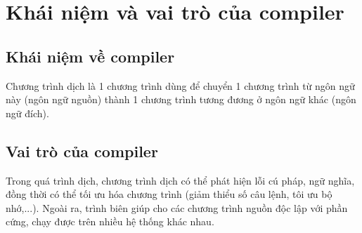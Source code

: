 \section{Khái niệm và vai trò của compiler}
\subsection{Khái niệm về compiler}
Chương trình dịch là 1 chương trình dùng để
chuyển 1 chương trình từ ngôn ngữ này (ngôn ngữ nguồn) thành 1 chương
trình tương đương ở ngôn ngữ khác (ngôn ngữ đích).
\subsection{Vai trò của compiler}
Trong quá trình dịch, chương trình dịch có 
thể phát hiện lỗi cú pháp, ngữ nghĩa, đồng thời có thể tối ưu hóa chương
trình (giảm thiểu số câu lệnh, tôi ưu bộ nhớ,...). Ngoài ra, trình biên
giúp cho các chương trình nguồn độc lập với phần cứng, chạy được trên
nhiều hệ thống khác nhau.